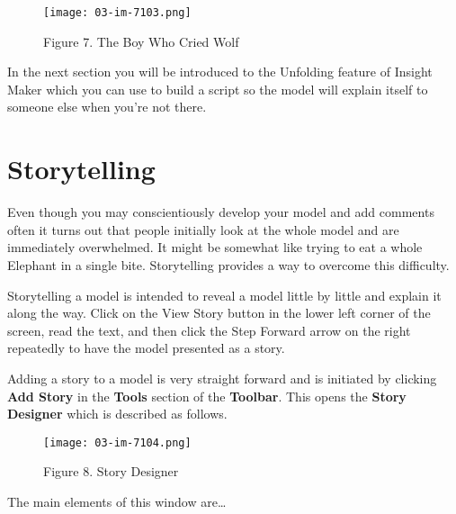 \documentclass[]{memoir}
\let\Oldincludegraphics\includegraphics
\renewcommand{\includegraphics}[1]{\Oldincludegraphics[max size={\textwidth}{\textheight}]{#1}}
\renewcommand{\u}[1]{\textbf{#1}}
\begin{document}
\begin{figure}[htbp]
\centering
\texttt{[image: 03-im-7103.png]}
\caption{Figure 7. The Boy Who Cried Wolf}
\end{figure}

In the next section you will be introduced to the Unfolding feature of
Insight Maker which you can use to build a script so the model will
explain itself to someone else when you're not there.

\section{Storytelling}

Even though you may conscientiously develop your model and add comments
often it turns out that people initially look at the whole model and are
immediately overwhelmed. It might be somewhat like trying to eat a whole
Elephant in a single bite. Storytelling provides a way to overcome this
difficulty.

Storytelling a model is intended to reveal a model little by little and
explain it along the way. Click on the View Story button in the lower
left corner of the screen, read the text, and then click the Step
Forward arrow on the right repeatedly to have the model presented as a
story.

Adding a story to a model is very straight forward and is initiated by
clicking \u{Add Story} in the \u{Tools} section of the \u{Toolbar}. This
opens the \u{Story Designer} which is described as follows.

\begin{figure}[htbp]
\centering
\texttt{[image: 03-im-7104.png]}
\caption{Figure 8. Story Designer}
\end{figure}

The main elements of this window are\ldots{}
\end{document}
